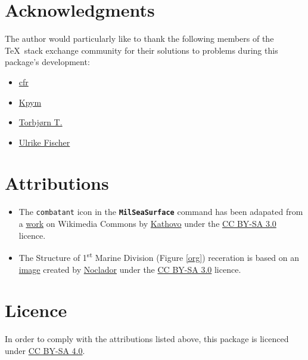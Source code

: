 \documentclass[a4paper, titlepage]{article}
\begin{document}
\clearpage

\begin{versionhistory}
\renewcommand \vhAuthorColWidth{6cm}
\end{versionhistory}

\clearpage

\section*{Acknowledgments}

The author would particularly like to thank the following members of the \TeX\  stack exchange community for their solutions to problems during this package\rq{}s development:

\begin{itemize}
\item \href{https://tex.stackexchange.com/users/39222}{cfr}
\item \href{https://tex.stackexchange.com/users/9335}{Kpym}
\item \href{https://tex.stackexchange.com/users/586}{Torbj\o rn T.}
\item \href{https://tex.stackexchange.com/users/2388}{Ulrike Fischer}
\end{itemize}

\section*{Attributions}

\begin{itemize}
\item The \texttt{combatant} icon in the \textbf{\texttt{MilSeaSurface}} command has been adapated from a \href{https://commons.wikimedia.org/wiki/File:Small_battle_symbol.svg}{work} on Wikimedia Commons by \href{https://commons.wikimedia.org/wiki/User:Kathovo}{Kathovo} under the \href{https://creativecommons.org/licenses/by-sa/3.0/}{CC BY-SA 3.0} licence.
\item The Structure of 1\textsuperscript{st} Marine Division (Figure \ref{org}) receration is based on an \href{https://commons.wikimedia.org/wiki/File:1st_US_Marine_Division.png}{image} created by \href{https://commons.wikimedia.org/wiki/User:Noclador}{Noclador} under the \href{https://creativecommons.org/licenses/by-sa/3.0/}{CC BY-SA 3.0} licence.
\end{itemize}

\section*{Licence}
In order to comply with the attributions listed above, this package is licenced under \href{https://creativecommons.org/licenses/by-sa/4.0/}{CC BY-SA 4.0}.
\end{document}
